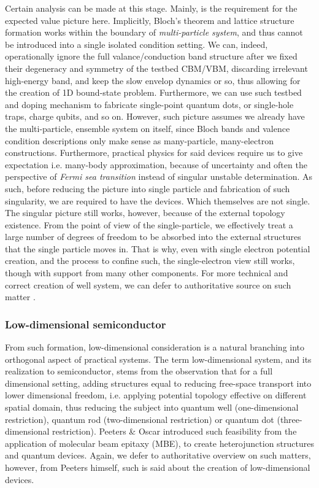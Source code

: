 \documentclass[%
 reprint,
 amsmath,amssymb,
 aps,
]{revtex4-2}
\begin{document}
Certain analysis can be made at this stage. Mainly, is the requirement for the expected value picture here. Implicitly, Bloch's theorem and lattice structure formation works within the boundary of \textit{multi-particle system}, and thus cannot be introduced into a single isolated condition setting. We can, indeed, operationally ignore the full valance/conduction band structure after we fixed their degeneracy and symmetry of the testbed CBM/VBM, discarding irrelevant high-energy band, and keep the slow envelop dynamics or so, thus allowing for the creation of 1D bound-state problem. Furthermore, we can use such testbed and doping mechanism to fabricate single-point quantum dots, or single-hole traps, charge qubits, and so on. However, such picture assumes we already have the multi-particle, ensemble system on itself, since Bloch bands and valence condition descriptions only make sense as many-particle, many-electron constructions. Furthermore, practical physics for said devices require us to give expectation i.e. many-body approximation, because of uncertainty and often the perspective of \textit{Fermi sea transition} instead of singular unstable determination. As such, before reducing the picture into single particle and fabrication of such singularity, we are required to have the devices. Which themselves are not single. The singular picture still works, however, because of the external topology existence. From the point of view of the single-particle, we effectively treat a large number of degrees of freedom to be absorbed into the external structures that the single particle moves in. That is why, even with single electron potential creation, and the process to confine such, the single-electron view still works, though with support from many other components. For more technical and correct creation of well system, we can defer to authoritative source on such matter \cite{David2020OpticalPO,davies1998}. 

\subsubsection{Low-dimensional semiconductor}

From such formation, low-dimensional consideration is a natural branching into orthogonal aspect of practical systems. The term low-dimensional system, and its realization to semiconductor, stems from the observation that for a full dimensional setting, adding structures equal to reducing free-space transport into lower dimensional freedom, i.e. applying potential topology effective on different spatial domain, thus reducing the subject into quantum well (one-dimensional restriction), quantum rod (two-dimensional restriction) or quantum dot (three-dimensional restriction). Peeters \& Oscar \cite{Peeters1992LowDS} introduced such feasibility from the application of molecular beam epitaxy (MBE), to create heterojunction structures and quantum devices. Again, we defer to authoritative overview on such matters, however, from Peeters himself, such is said about the creation of low-dimensional devices. 
\end{document}
